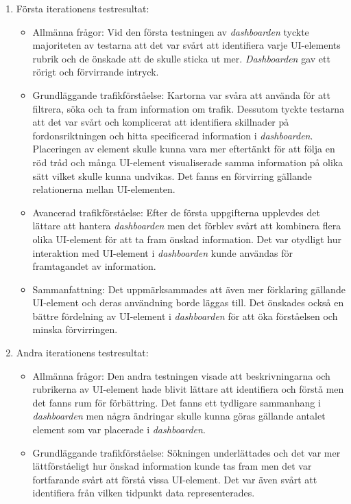 \documentclass[12pt]{kththesis}
\begin{document}
\begin{enumerate}
\item Första iterationens testresultat:
\begin{itemize}
\item Allmänna frågor: Vid den första testningen av \textit{dashboarden} tyckte majoriteten av testarna att det var svårt att identifiera varje UI-elements rubrik och de önskade att de skulle sticka ut mer. \textit{Dashboarden} gav ett rörigt och förvirrande intryck. 

\item Grundläggande trafikförståelse: Kartorna var svåra att använda för att filtrera, söka och ta fram information om trafik. Dessutom tyckte testarna att det var svårt och komplicerat att identifiera skillnader på fordonsriktningen och hitta specificerad information i \textit{dashboarden}. Placeringen av element skulle kunna vara mer eftertänkt för att följa en röd tråd och många UI-element visualiserade samma information på olika sätt vilket skulle kunna undvikas. Det fanns en förvirring gällande relationerna mellan UI-elementen. 

\item Avancerad trafikförståelse: Efter de första uppgifterna upplevdes det lättare att hantera \textit{dashboarden} men det förblev svårt att kombinera flera olika UI-element för att ta fram önskad information. Det var otydligt hur interaktion med UI-element i \textit{dashboarden} kunde användas för framtagandet av information. 

\item Sammanfattning: Det uppmärksammades att även mer förklaring gällande UI-element och deras användning borde läggas till. Det önskades också en bättre fördelning av UI-element i \textit{dashboarden} för att öka förståelsen och minska förvirringen.
\end{itemize}

\item Andra iterationens testresultat:

\begin{itemize}
\item Allmänna frågor: Den andra testningen visade att beskrivningarna och rubrikerna av UI-element hade blivit lättare att identifiera och förstå men det fanns rum för förbättring. Det fanns ett tydligare sammanhang i \textit{dashboarden} men några ändringar skulle kunna göras gällande antalet element som var placerade i \textit{dashboarden}.

\item Grundläggande trafikförståelse: Sökningen underlättades och det var mer lättförståeligt hur önskad information kunde tas fram men det var fortfarande svårt att förstå vissa UI-element. Det var även svårt att identifiera från vilken tidpunkt data representerades.


\end{itemize}
\end{enumerate}
\end{document}
